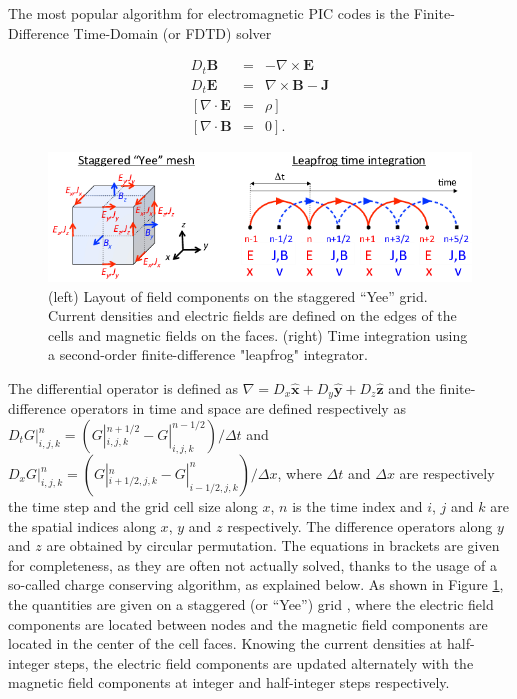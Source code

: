 

The most popular algorithm for electromagnetic PIC codes is the Finite-Difference
Time-Domain (or FDTD) solver

\begin{subequations}
\begin{eqnarray}
D_{t}\mathbf{B} & = & -\nabla\times\mathbf{E}\label{Eq:Faraday-2}\\
D_{t}\mathbf{E} & = & \nabla\times\mathbf{B}-\mathbf{J}\label{Eq:Ampere-2}\\
\left[\nabla\cdot\mathbf{E}\right. & = & \left.\rho\right]\label{Eq:Gauss-2}\\
\left[\nabla\cdot\mathbf{B}\right. & = & \left.0\right].\label{Eq:divb-2}
\end{eqnarray}
\end{subequations}

\begin{figure}
\includegraphics[scale=0.7]{Yee_grid.png}
\caption{\label{fig:yee_grid}(left) Layout of field components on the staggered ``Yee'' grid. Current densities and electric fields are defined on the edges of the cells and magnetic fields on the faces. (right) Time integration using a second-order finite-difference "leapfrog" integrator.}
\end{figure}

The differential operator is defined as $\nabla=D_{x}\mathbf{\hat{x}}+D_{y}\mathbf{\hat{y}}+D_{z}\mathbf{\hat{z}}$
and the finite-difference operators in time and space are defined
respectively as $ $$D_{t}G|_{i,j,k}^{n}=\left(G|_{i,j,k}^{n+1/2}-G|_{i,j,k}^{n-1/2}\right)/\Delta t$$ $
and $D_{x}G|_{i,j,k}^{n}=\left(G|_{i+1/2,j,k}^{n}-G|_{i-1/2,j,k}^{n}\right)/\Delta x$,
where $\Delta t$ and $\Delta x$ are respectively the time step and
the grid cell size along $x$, $n$ is the time index and $i$, $j$
and $k$ are the spatial indices along $x$, $y$ and $z$ respectively.
The difference operators along $y$ and $z$ are obtained by circular
permutation. The equations in brackets are given for completeness,
as they are often not actually solved, thanks to the usage of a so-called
charge conserving algorithm, as explained below. As shown in Figure
\ref{fig:yee_grid}, the quantities are given on a staggered (or ``Yee'')
grid \cite{Yee}, where the electric field components are located
between nodes and the magnetic field components are located in the
center of the cell faces. Knowing the current densities at half-integer steps, 
the electric field components are updated alternately with the magnetic 
field components at integer and half-integer steps respectively.
